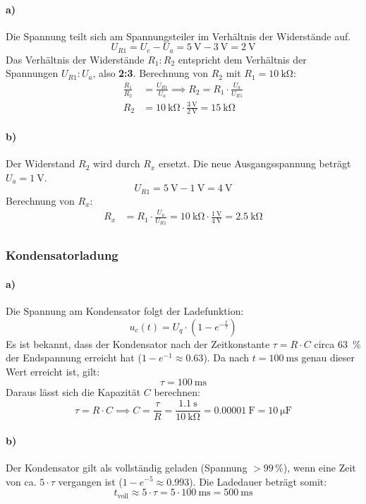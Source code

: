 \paragraph{a)} Die Spannung teilt sich am Spannungsteiler im Verhältnis der Widerstände auf.
\[
    U_{R1} = U_e - U_a = \SI{5}{\volt} - \SI{3}{\volt} = \SI{2}{\volt}
\]
Das Verhältnis der Widerstände $R_1 : R_2$ entspricht dem Verhältnis der Spannungen $U_{R1} : U_a$, also \textbf{2:3}. Berechnung von $R_2$ mit $R_1 = \SI{10}{\kilo\ohm}$:
\begin{align*}
    \frac{R_1}{R_2} &= \frac{U_{R1}}{U_a} \implies R_2 = R_1 \cdot \frac{U_a}{U_{R1}} \\
    R_2 &= \SI{10}{\kilo\ohm} \cdot \frac{\SI{3}{\volt}}{\SI{2}{\volt}} = \SI{15}{\kilo\ohm} 
\end{align*}

\paragraph{b)} Der Widerstand $R_2$ wird durch $R_x$ ersetzt. Die neue Ausgangsspannung beträgt $U_a = \SI{1}{\volt}$.
\[
    U_{R1} = \SI{5}{\volt} - \SI{1}{\volt} = \SI{4}{\volt}
\]
Berechnung von $R_x$:
\begin{align*}
    R_x &= R_1 \cdot \frac{U_a}{U_{R1}} = \SI{10}{\kilo\ohm} \cdot \frac{\SI{1}{\volt}}{\SI{4}{\volt}} = \SI{2.5}{\kilo\ohm} \\
\end{align*}

\subsubsection{Kondensatorladung}

\paragraph{a)} Die Spannung am Kondensator folgt der Ladefunktion:
\[
u_c(t) = U_q \cdot \left(1 - e^{-\frac{t}{\tau}}\right)
\]
Es ist bekannt, dass der Kondensator nach der Zeitkonstante $\tau = R \cdot C$ circa \SI{63}{\percent} der Endspannung erreicht hat ($1 - e^{-1} \approx 0.63$). Da nach $t = \SI{100}{\milli\second}$ genau dieser Wert erreicht ist, gilt:
\[
\tau = \SI{100}{\milli\second}
\]
Daraus lässt sich die Kapazität $C$ berechnen:
\[
    \tau = R \cdot C \implies C = \frac{\tau}{R} = \frac{\SI{1.1}{\second}}{\SI{10}{\kilo\ohm}} = \SI{0.00001}{\farad} = \SI{10}{\micro\farad}
\]

\paragraph{b)} Der Kondensator gilt als vollständig geladen (Spannung $> 99\,\%$), wenn eine Zeit von ca. $5 \cdot \tau$ vergangen ist ($1 - e^{-5} \approx 0.993$). Die Ladedauer beträgt somit:
\[
    t_{\text{voll}} \approx 5 \cdot \tau = 5 \cdot \SI{100}{\milli\second} = \SI{500}{\milli\second}
\]

